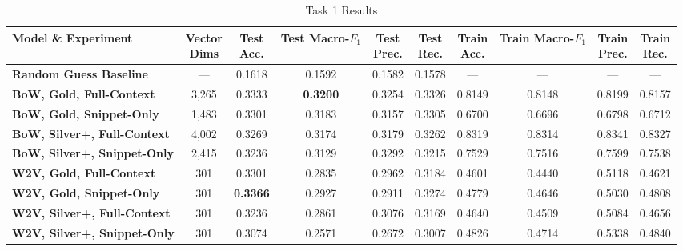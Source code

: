 \documentclass[12pt, a4paper]{article}
\begin{document}
\begin{table}[htbp]
  \centering
  \caption{Task 1 Results}
  \label{tab:task1_results}
  \vspace{4pt}
  \scriptsize
  \setlength{\tabcolsep}{2.5pt}
  \begin{tabularx}{\textwidth}{l c c c c c c c c c}
    \toprule
    \textbf{Model \& Experiment} & \makecell{\textbf{Vector}\\\textbf{Dims}} & \makecell{\textbf{Test}\\\textbf{Acc.}} & \makecell{\textbf{Test}\\\textbf{Macro-$F_1$}} & \makecell{\textbf{Test}\\\textbf{Prec.}} & \makecell{\textbf{Test}\\\textbf{Rec.}} & \makecell{\textbf{Train}\\\textbf{Acc.}} & \makecell{\textbf{Train}\\\textbf{Macro-$F_1$}} & \makecell{\textbf{Train}\\\textbf{Prec.}} & \makecell{\textbf{Train}\\\textbf{Rec.}} \\
    \midrule
    \textbf{Random Guess Baseline} & — & 0.1618 & 0.1592 & 0.1582 & 0.1578 & — & — & — & — \\
    \midrule
    \textbf{BoW, Gold, Full-Context} & 3,265 & 0.3333 & \textbf{0.3200} & 0.3254 & 0.3326 & 0.8149 & 0.8148 & 0.8199 & 0.8157 \\
    \addlinespace
    \textbf{BoW, Gold, Snippet-Only} & 1,483 & 0.3301 & 0.3183 & 0.3157 & 0.3305 & 0.6700 & 0.6696 & 0.6798 & 0.6712 \\
    \addlinespace
    \textbf{BoW, Silver+, Full-Context} & 4,002 & 0.3269 & 0.3174 & 0.3179 & 0.3262 & 0.8319 & 0.8314 & 0.8341 & 0.8327 \\
    \addlinespace
    \textbf{BoW, Silver+, Snippet-Only} & 2,415 & 0.3236 & 0.3129 & 0.3292 & 0.3215 & 0.7529 & 0.7516 & 0.7599 & 0.7538 \\
    \midrule
    \textbf{W2V, Gold, Full-Context} & 301 & 0.3301 & 0.2835 & 0.2962 & 0.3184 & 0.4601 & 0.4440 & 0.5118 & 0.4621 \\
    \addlinespace
    \textbf{W2V, Gold, Snippet-Only} & 301 & \textbf{0.3366} & 0.2927 & 0.2911 & 0.3274 & 0.4779 & 0.4646 & 0.5030 & 0.4808 \\
    \addlinespace
    \textbf{W2V, Silver+, Full-Context} & 301 & 0.3236 & 0.2861 & 0.3076 & 0.3169 & 0.4640 & 0.4509 & 0.5084 & 0.4656 \\
    \addlinespace
    \textbf{W2V, Silver+, Snippet-Only} & 301 & 0.3074 & 0.2571 & 0.2672 & 0.3007 & 0.4826 & 0.4714 & 0.5338 & 0.4840 \\
    \bottomrule
  \end{tabularx}
\end{table}
\end{document}
